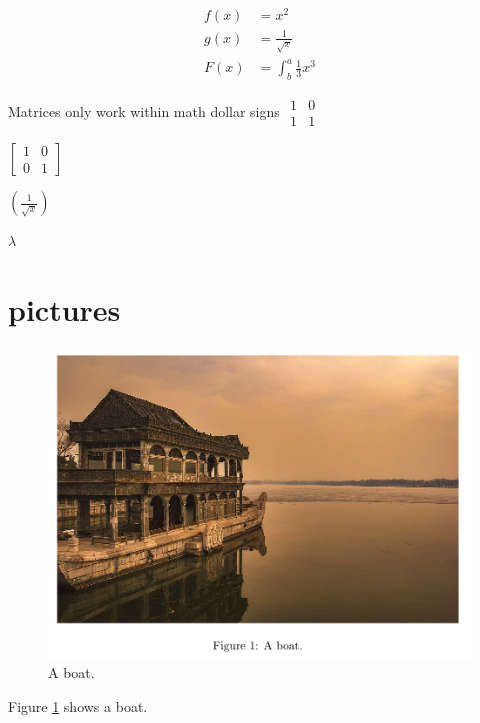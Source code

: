 \documentclass{article}
\begin{document}


 \begin{align*}
	     f(x) &= x^2\\
	     g(x) &= \frac{1}{\sqrt{x}}\\
	     F(x) &= \int^a_b \frac{1}{3}x^3
 \end{align*}


 Matrices only work within math dollar signs $
 	\begin{matrix}
		 1 & 0\\
		 1 & 1
	 \end{matrix}
 $

 $
 [
	 \begin{matrix}
		 1 & 0\\
		 0 & 1
	 \end{matrix}
 ]
 $

$\left( \frac{1}{\sqrt{x}} \right)$

$\lambda$


\section{pictures}


\begin{figure}[h!]
	\includegraphics[width=\linewidth]{boat.jpg}
	\caption{A boat.}
	\label{fig:boat1}
\end{figure}

Figure \ref{fig:boat1} shows a boat.
\end{document}
